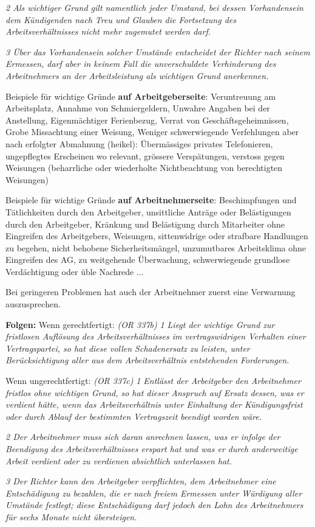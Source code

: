\begin{description}
  \textit{2 Als wichtiger Grund gilt namentlich jeder Umstand, bei dessen Vorhandensein dem Kündigenden nach Treu und Glauben die Fortsetzung des Arbeitsverhältnisses nicht mehr zugemutet werden darf.}

  \textit{3 Über das Vorhandensein solcher Umstände entscheidet der Richter nach seinem Ermessen, darf aber in keinem Fall die unverschuldete Verhinderung des Arbeitnehmers an der Arbeitsleistung als wichtigen Grund anerkennen.}

  Beispiele für wichtige Gründe \textbf{auf Arbeitgeberseite}: Veruntreuung am Arbeitsplatz, Annahme von Schmiergeldern, Unwahre Angaben bei der Anstellung, Eigenmächtiger Ferienbezug, Verrat von Geschäftsgeheimnissen, Grobe Missachtung einer Weisung, Weniger schwerwiegende Verfehlungen aber nach erfolgter Abmahnung (heikel): Übermässiges privates Telefonieren, ungepflegtes Erscheinen wo relevant, grössere Verspätungen, verstoss gegen Weisungen (beharrliche oder wiederholte Nichtbeachtung von berechtigten Weisungen)

  Beispiele für wichtige Gründe \textbf{auf Arbeitnehmerseite}: Beschimpfungen und Tätlichkeiten durch den Arbeitgeber, unsittliche Anträge oder Belästigungen durch den Arbeitgeber, Kränkung und Belästigung durch Mitarbeiter ohne Eingreifen des Arbeitgebers, Weisungen, sittenwidrige oder strafbare Handlungen zu begehen, nicht behobene Sicherheitsmängel, unzumutbares Arbeitsklima ohne Eingreifen des AG, zu weitgehende Überwachung, schwerwiegende grundlose Verdächtigung oder üble Nachrede ... 
  
  Bei geringeren Problemen hat auch der Arbeitnehmer zuerst eine Verwarnung auszusprechen.

  \textbf{Folgen:} Wenn gerechtfertigt: \textit{(OR 337b)} \textit{1 Liegt der wichtige Grund zur fristlosen Auflösung des Arbeitsverhältnisses im vertragswidrigen Verhalten einer Vertragspartei, so hat diese vollen Schadenersatz zu leisten, unter Berücksichtigung aller aus dem Arbeitsverhältnis entstehenden Forderungen.}

  Wenn ungerechtfertigt: \textit{(OR 337c)} \textit{1 Entlässt der Arbeitgeber den Arbeitnehmer fristlos ohne wichtigen Grund, so hat dieser Anspruch auf Ersatz dessen, was er verdient hätte, wenn das Arbeitsverhältnis unter Einhaltung der Kündigungsfrist oder durch Ablauf der bestimmten Vertragszeit beendigt worden wäre.}

  \textit{2 Der Arbeitnehmer muss sich daran anrechnen lassen, was er infolge der Beendigung des Arbeitsverhältnisses erspart hat und was er durch anderweitige Arbeit verdient oder zu verdienen absichtlich unterlassen hat.}

  \textit{3 Der Richter kann den Arbeitgeber verpflichten, dem Arbeitnehmer eine Entschädigung zu bezahlen, die er nach freiem Ermessen unter Würdigung aller Umstände festlegt; diese Entschädigung darf jedoch den Lohn des Arbeitnehmers für sechs Monate nicht übersteigen.}

\end{description}

